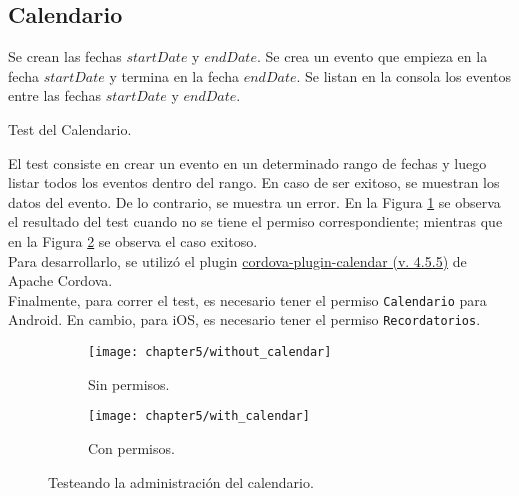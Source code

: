 \subsection{Calendario}
\begin{algorithm}
	\begin{algorithmic}[1]
		\STATE Se crean las fechas $startDate$ y $endDate$.
		\STATE Se crea un evento que empieza en la fecha $startDate$ y termina en la fecha $endDate$.
		\STATE Se listan en la consola los eventos entre las fechas $startDate$ y $endDate$.
	\end{algorithmic}
	\caption{Test del Calendario.}\label{alg:chap5:test_calendario}
\end{algorithm}
El test consiste en crear un evento en un determinado rango de fechas y luego listar todos los eventos dentro del rango. En caso de ser exitoso, se muestran los datos del evento. De lo contrario, se muestra un error. En la Figura \ref{fig:ch05:without_calendar} se observa el resultado del test cuando no se tiene el permiso correspondiente; mientras que en la Figura \ref{fig:ch05:with_calendar} se observa el caso exitoso.\\
Para desarrollarlo, se utilizó el plugin \href{https://www.npmjs.com/package/cordova-plugin-calendar}{cordova-plugin-calendar (v. 4.5.5)} de Apache Cordova.\\
Finalmente, para correr el test, es necesario tener el permiso \texttt{Calendario} para Android. En cambio, para iOS, es necesario tener el permiso \texttt{Recordatorios}.
\begin{figure}[hbtp]
    \centering
    \begin{subfigure}{0.3\linewidth}
        \texttt{[image: chapter5/without\_calendar]}
        \caption{Sin permisos.}
        \label{fig:ch05:without_calendar}
    \end{subfigure}
    \begin{subfigure}{0.3\linewidth}
        \texttt{[image: chapter5/with\_calendar]}
        \caption{Con permisos.}
        \label{fig:ch05:with_calendar}
    \end{subfigure}
    \caption{Testeando la administración del calendario.}
	\label{fig:ch05:calendar-cases}
\end{figure}
\newpage
